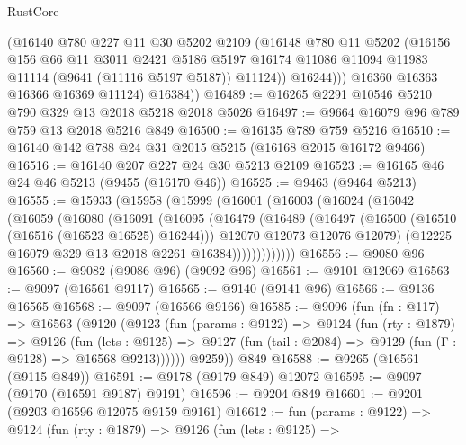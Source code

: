 \begin{lexlean}{RustCore}
\begin{coremodule}
              (@16140
                @780
                @227
                @11
                @30
                @5202
                @2109
                (@16148
                  @780
                  @11
                  @5202
                  (@16156
                    @156
                    @66
                    @11
                    @3011
                    @2421
                    @5186
                    @5197
                    @16174
                    @11086
                    @11094
                    @11983
                    @11114
                    (@9641 (@11116 @5197 @5187))
                    @11124))
                @16244)))
          @16360
          @16363
          @16366
          @16369
          @11124)
        @16384))
@16489 := @16265 @2291 @10546 @5210 @790 @329 @13 @2018 @5218 @2018 @5026
@16497 := @9664 @16079 @96 @789 @759 @13 @2018 @5216 @849
@16500 := @16135 @789 @759 @5216
@16510 := @16140 @142 @788 @24 @31 @2015 @5215 (@16168 @2015 @16172 @9466)
@16516 := @16140 @207 @227 @24 @30 @5213 @2109
@16523 := @16165 @46 @24 @46 @5213 (@9455 (@16170 @46))
@16525 := @9463 (@9464 @5213)
@16555 := @15933
    (@15958
      (@15999
        (@16001
          (@16003
            (@16024
              (@16042
                (@16059
                  (@16080
                    (@16091
                      (@16095
                        (@16479
                          (@16489
                            (@16497
                              (@16500 (@16510 (@16516 (@16523 @16525) @16244)))
                              @12070
                              @12073
                              @12076
                              @12079)
                            (@12225 @16079 @329 @13 @2018 @2261 @16384)))))))))))))
@16556 := @9080 @96
@16560 := @9082 (@9086 @96) (@9092 @96)
@16561 := @9101 @12069
@16563 := @9097 (@16561 @9117)
@16565 := @9140 (@9141 @96)
@16566 := @9136 @16565
@16568 := @9097 (@16566 @9166)
@16585 := @9096
    (fun (fn : @117) =>
    @16563
      (@9120
        (@9123
          (fun (params : @9122) =>
          @9124
            (fun (rty : @1879) =>
            @9126
              (fun (lets : @9125) =>
              @9127 (fun (tail : @2084) => @9129 (fun (Γ : @9128) => @16568 @9213))))))
        @9259))
    @849
@16588 := @9265 (@16561 (@9115 @849))
@16591 := @9178 (@9179 @849) @12072
@16595 := @9097 (@9170 (@16591 @9187) @9191)
@16596 := @9204 @849
@16601 := @9201 (@9203 @16596 @12075 @9159 @9161)
@16612 := fun (params : @9122) =>
  @9124
    (fun (rty : @1879) =>
    @9126
      (fun (lets : @9125) =>

\end{coremodule}
\end{lexlean}
